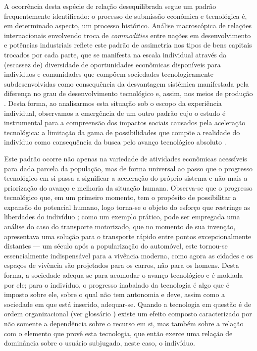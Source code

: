 A ocorrência desta espécie de relação desequilibrada segue um padrão frequentemente identificado: o processo de submissão
econômica e tecnológica é, em determinado aspecto, um processo histórico. Análise macroscópica de relações
internacionais envolvendo troca de \textit{commodities} entre nações em desenvolvimento e potências industriais reflete
este padrão de assimetria nos tipos de bens capitais trocados por cada parte, que se manifesta na escala individual
através da (escassez de) diversidade de oportunidades econômicas disponíveis para indivíduos e comunidades que compõem
sociedades tecnologicamente subdesenvolvidas como consequência da desvantagem sistêmica manifestada pela diferença no
grau de desenvolvimento tecnológico e, assim, nos meios de produção \cite[27-30]{secretariat1977}. Desta forma, ao
analisarmos esta situação sob o escopo da experiência individual, observamos a emergência de um outro padrão cujo o
estudo é instrumental para a compreensão dos impactos sociais causados pela aceleração tecnológica: a limitação da gama
de possibilidades que compõe a realidade do indivíduo como consequência da busca pelo avanço tecnológico absoluto
\cite[\S51]{kaczynski1995}.

Este padrão ocorre não apenas na variedade de atividades econômicas acessíveis para dada parcela da população, mas de
forma universal ao passo que o progresso tecnológico em si passa a significar a aceleração do próprio sistema e não mais
a priorização do avanço e melhoria da situação humana. Observa-se que o progresso tecnológico que, em um primeiro
momento, tem o propósito de possibilitar a expansão do potencial humano, logo torna-se o objeto do esforço que restringe
as liberdades do indivíduo \cite[\S127]{kaczynski1995}; como um exemplo prático, pode ser empregada uma análise do caso
do transporte motorizado, que no momento de sua invenção, apresentava uma solução para o transporte rápido entre pontos
excepcionalmente distantes --- um século após a popularização do automóvel, este tornou-se essencialmente indispensável
para a vivência moderna, como agora as cidades e os espaços de vivência são projetados para os carros, não para os
homens. Desta forma, a sociedade adequa-se para acomodar o avanço tecnológico e é moldada por ele; para
o indivíduo, o progresso inabalado da tecnologia é algo que é imposto sobre ele, sobre o qual não tem autonomia e deve,
assim como a sociedade em que está inserido, adequar-se. Quando a tecnologia em questão é de ordem organizacional (ver
glossário \cite[\S207-212]{kaczynski1995}) existe um efeito composto caracterizado por não somente a dependência sobre o
recurso em si, mas também sobre a relação com o elemento que provê esta tecnologia, que então exerce uma relação de
dominância sobre o usuário subjugado, neste caso, o indivíduo.

